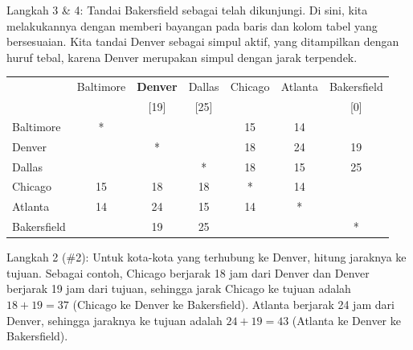 \begin{example}{}
\noindent Langkah 3 \& 4:  Tandai Bakersfield sebagai telah dikunjungi.  Di sini, kita melakukannya dengan memberi bayangan pada baris dan kolom tabel yang bersesuaian.  Kita tandai Denver sebagai simpul aktif, yang ditampilkan dengan huruf tebal, karena Denver merupakan simpul dengan jarak terpendek.
 \begin{center}
 \begin{tabular}{|l|c|c|c|c|c|c|}
 \hline
 & Baltimore & \textbf{Denver} & Dallas & Chicago & Atlanta & \cellcolor{yellow}Bakersfield\\
 &&[19]&[25]&&&\cellcolor{yellow}[0]\\
 \hline
 Baltimore & * &&&15&14&\cellcolor{yellow}\\
 \hline
 Denver &&*&&18&24&\cellcolor{yellow}19\\
 \hline
Dallas&&&*&18&15&\cellcolor{yellow}25\\
 \hline
 Chicago &15&18&18&*&14&\cellcolor{yellow}\\
 \hline
 Atlanta & 14 & 24&15&14&*&\cellcolor{yellow}\\
 \hline
 \cellcolor{yellow}Bakersfield &\cellcolor{yellow}&\cellcolor{yellow}19&\cellcolor{yellow}25&\cellcolor{yellow}&\cellcolor{yellow}&\cellcolor{yellow}*\\
 \hline
 \end{tabular}
 \end{center}

\noindent Langkah 2 (\#2):  Untuk kota-kota yang terhubung ke Denver, hitung jaraknya ke tujuan.  Sebagai contoh, Chicago berjarak 18 jam dari Denver dan Denver berjarak 19 jam dari tujuan, sehingga jarak Chicago ke tujuan adalah $18+19 = 37$ (Chicago ke Denver ke Bakersfield).  Atlanta berjarak 24 jam dari Denver, sehingga jaraknya ke tujuan adalah $24+19 = 43$ (Atlanta ke Denver ke Bakersfield).\\


\end{example}
